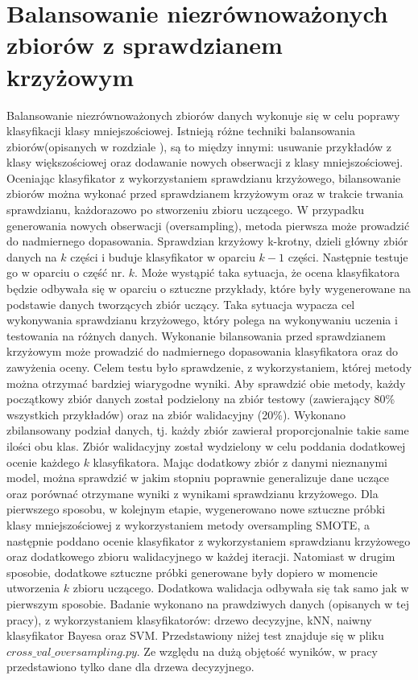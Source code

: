 \section{Balansowanie niezrównoważonych zbiorów z sprawdzianem krzyżowym}
Balansowanie niezrównoważonych zbiorów danych wykonuje się w celu poprawy klasyfikacji klasy mniejszościowej. Istnieją różne techniki balansowania zbiorów(opisanych w rozdziale ), są to między innymi: usuwanie przykładów z klasy większościowej oraz dodawanie nowych obserwacji z klasy mniejszościowej. Oceniając klasyfikator z wykorzystaniem sprawdzianu krzyżowego, bilansowanie zbiorów można wykonać przed sprawdzianem krzyżowym oraz w trakcie trwania sprawdzianu, każdorazowo po stworzeniu zbioru uczącego. W przypadku generowania nowych obserwacji (oversampling), metoda pierwsza może prowadzić do nadmiernego dopasowania. Sprawdzian krzyżowy k-krotny, dzieli główny zbiór danych na $k$ części i buduje klasyfikator w oparciu $k-1$ części. Następnie testuje go w oparciu o część nr. $k$. Może wystąpić taka sytuacja, że ocena klasyfikatora będzie odbywała się w oparciu o sztuczne przykłady, które były wygenerowane na podstawie danych tworzących zbiór uczący. Taka sytuacja wypacza cel wykonywania sprawdzianu krzyżowego, który polega na wykonywaniu uczenia i testowania na różnych danych. Wykonanie bilansowania przed sprawdzianem krzyżowym może prowadzić do nadmiernego dopasowania klasyfikatora oraz do zawyżenia oceny. Celem testu było sprawdzenie, z wykorzystaniem, której metody można otrzymać bardziej wiarygodne wyniki. Aby sprawdzić obie metody, każdy początkowy zbiór danych został podzielony na zbiór testowy (zawierający 80\% wszystkich przykładów) oraz na zbiór walidacyjny (20\%). Wykonano zbilansowany podział danych, tj. każdy zbiór zawierał proporcjonalnie takie same ilości obu klas. Zbiór walidacyjny został wydzielony w celu poddania dodatkowej ocenie każdego $k$ klasyfikatora. Mając dodatkowy zbiór z danymi nieznanymi model, można sprawdzić w jakim stopniu poprawnie generalizuje dane uczące oraz porównać otrzymane wyniki z wynikami sprawdzianu krzyżowego. Dla pierwszego sposobu, w kolejnym etapie, wygenerowano nowe sztuczne próbki klasy mniejszościowej z wykorzystaniem metody oversampling SMOTE, a następnie poddano ocenie klasyfikator z wykorzystaniem sprawdzianu krzyżowego oraz dodatkowego zbioru walidacyjnego w każdej iteracji. Natomiast w drugim sposobie, dodatkowe sztuczne próbki generowane były dopiero w momencie utworzenia $k$ zbioru uczącego. Dodatkowa walidacja odbywała się tak samo jak w pierwszym sposobie. Badanie wykonano na prawdziwych danych (opisanych w tej pracy), z wykorzystaniem klasyfikatorów: drzewo decyzyjne, kNN, naiwny klasyfikator Bayesa oraz SVM. Przedstawiony niżej test znajduje się w pliku $cross\_val\_oversampling.py$. Ze względu na dużą objętość wyników, w pracy przedstawiono tylko dane dla drzewa decyzyjnego. \par
